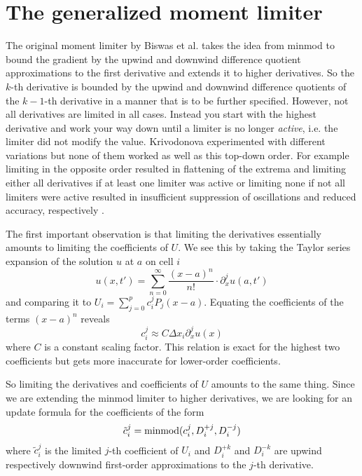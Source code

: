 \section{The generalized moment limiter}
\label{sec:moment}

The original moment limiter by Biswas et al. takes the idea from minmod to bound the gradient by the upwind and downwind difference quotient approximations to the first derivative and extends it to higher derivatives.
So the $k$-th derivative is bounded by the upwind and downwind difference quotients of the $k - 1$-th derivative in a manner that is to be further specified.
However, not all derivatives are limited in all cases.
Instead you start with the highest derivative and work your way down until a limiter is no longer \emph{active}, i.e. the limiter did not modify the value.
Krivodonova experimented with different variations but none of them worked as well as this top-down order.
For example limiting in the opposite order resulted in flattening of the extrema and limiting either all derivatives if at least one limiter was active or limiting none if not all limiters were active resulted in insufficient suppression of oscillations and reduced accuracy, respectively \cite[Remark 1]{Krivodonova}.

The first important observation is that limiting the derivatives essentially amounts to limiting the coefficients of $U$.
We see this by taking the Taylor series expansion of the solution $u$ at $a$ on cell $i$
\begin{equation*}
  u(x, t') = \sum_{n = 0}^{\infty} \frac{(x - a)^{n}}{n!} \cdot \partial_{x}^{j} u(a, t')
\end{equation*}
and comparing it to $U_{i} = \sum_{j = 0}^{p} c_{i}^{j} P_{j}(x - a)$.
Equating the coefficients of the terms $(x - a)^{n}$ reveals
\begin{equation*}
  c_{i}^{j} \approx C \Delta x_{i} \partial_{x}^{j} u(x)
\end{equation*}
where $C$ is a constant scaling factor.
This relation is exact for the highest two coefficients but gets more inaccurate for lower-order coefficients.

So limiting the derivatives and coefficients of $U$ amounts to the same thing.
Since we are extending the minmod limiter to higher derivatives, we are looking for an update formula for the coefficients of the form
\begin{equation*}
  \tilde{c}_{i}^{j} = \operatorname{minmod}(c_{i}^{j}, D_{i}^{+j}, D_{i}^{-j})
\end{equation*}
where $\tilde{c}_{i}^{j}$ is the limited $j$-th coefficient of $U_{i}$ and $D_{i}^{+k}$ and $D_{i}^{-k}$ are upwind respectively downwind first-order approximations to the $j$-th derivative.

